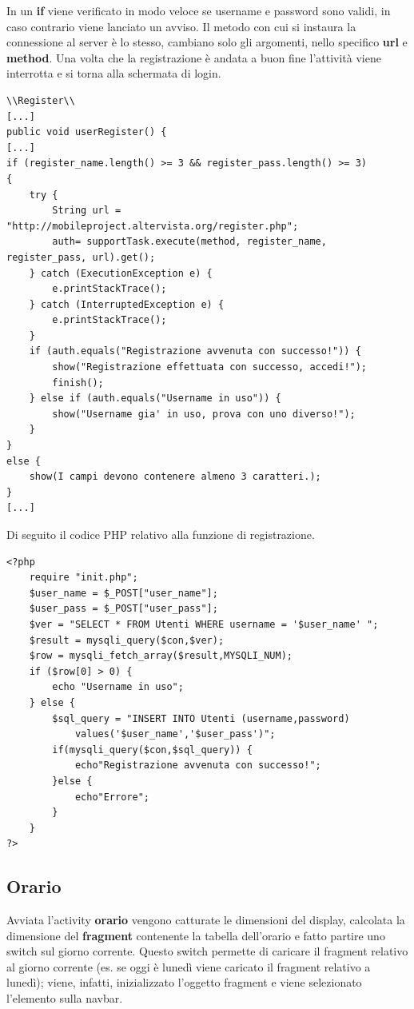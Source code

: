 \documentclass[a4paper, 50pt, twoside]{article}
\begin{document}
In un \textbf{if} viene verificato in modo veloce se username e password sono validi, in caso contrario viene lanciato un avviso.
Il metodo con cui si instaura la connessione al server è lo stesso, cambiano solo gli argomenti, nello specifico \textbf{url} e \textbf{method}. Una volta che la registrazione è andata a buon fine l'attività viene interrotta e si torna alla schermata di login.
\begin{lstlisting}
\\Register\\
[...]
public void userRegister() {
[...]
if (register_name.length() >= 3 && register_pass.length() >= 3)
{
	try {
		String url = "http://mobileproject.altervista.org/register.php";
		auth= supportTask.execute(method, register_name, register_pass, url).get();
	} catch (ExecutionException e) {
		e.printStackTrace();
	} catch (InterruptedException e) {
		e.printStackTrace();
	}
	if (auth.equals("Registrazione avvenuta con successo!")) {
		show("Registrazione effettuata con successo, accedi!");
		finish();
	} else if (auth.equals("Username in uso")) {
		show("Username gia' in uso, prova con uno diverso!");
	}
}
else {
	show(I campi devono contenere almeno 3 caratteri.);
}
[...]
\end{lstlisting}
Di seguito il codice PHP relativo alla funzione di registrazione.
\begin{lstlisting}
<?php
	require "init.php";
	$user_name = $_POST["user_name"];  
	$user_pass = $_POST["user_pass"];
	$ver = "SELECT * FROM Utenti WHERE username = '$user_name' ";
	$result = mysqli_query($con,$ver);
	$row = mysqli_fetch_array($result,MYSQLI_NUM);
	if ($row[0] > 0) {
		echo "Username in uso";
	} else {
		$sql_query = "INSERT INTO Utenti (username,password) 
			values('$user_name','$user_pass')";
		if(mysqli_query($con,$sql_query)) {
			echo"Registrazione avvenuta con successo!";
		}else {
			echo"Errore";
		}
	}
?>
\end{lstlisting}
\subsection{Orario}
Avviata l'activity \textbf{orario} vengono catturate le dimensioni del display, calcolata la dimensione del \textbf{fragment} contenente la tabella dell'orario e fatto partire uno switch sul giorno corrente. Questo switch permette di caricare il fragment relativo al giorno corrente (es. se oggi è lunedì viene caricato il fragment relativo a lunedì); viene, infatti, inizializzato l'oggetto fragment e viene selezionato l'elemento sulla navbar.
\end{document}
